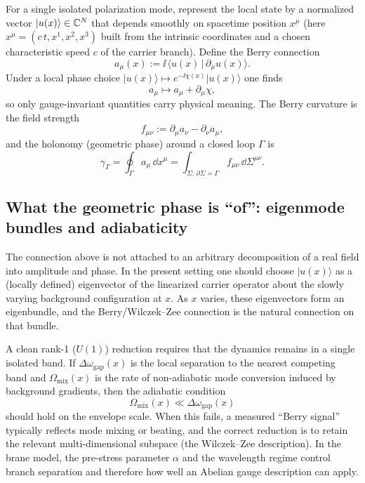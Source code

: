 For a single isolated polarization mode, represent the local state by a normalized vector
$\lvert u(x)\rangle\in\mathbb{C}^{N}$ that depends smoothly on spacetime position $x^\mu$
(here $x^\mu=(c\,t,x^1,x^2,x^3)$ built from the intrinsic coordinates and a chosen characteristic speed $c$ of the
carrier branch).
Define the Berry connection
\begin{equation}
  a_\mu(x) := \ii\,\langle u(x)\,|\,\partial_\mu u(x)\rangle.
  \label{eq:berry-connection}
\end{equation}
Under a local phase choice $\lvert u(x)\rangle\mapsto e^{-\ii\chi(x)}\lvert u(x)\rangle$ one finds
\begin{equation}
  a_\mu \mapsto a_\mu + \partial_\mu \chi,
  \label{eq:berry-gauge}
\end{equation}
so only gauge-invariant quantities carry physical meaning.
The Berry curvature is the field strength
\begin{equation}
  f_{\mu\nu} := \partial_\mu a_\nu - \partial_\nu a_\mu,
  \label{eq:berry-curvature}
\end{equation}
and the holonomy (geometric phase) around a closed loop $\Gamma$ is
\begin{equation}
  \gamma_\Gamma
  = \oint_\Gamma a_\mu\,\dd x^\mu
  = \int_{\Sigma:\,\partial\Sigma=\Gamma} f_{\mu\nu}\,\dd\Sigma^{\mu\nu}.
  \label{eq:berry-holonomy}
\end{equation}

\subsection{What the geometric phase is ``of'': eigenmode bundles and adiabaticity}
\label{subsec:berry-of}

The connection above is not attached to an arbitrary decomposition of a real field into amplitude and phase.
In the present setting one should choose $\lvert u(x)\rangle$ as a (locally defined) eigenvector of the
linearized carrier operator about the slowly varying background configuration at $x$.
As $x$ varies, these eigenvectors form an eigenbundle, and the Berry/Wilczek--Zee connection is the natural
connection on that bundle.

A clean rank-1 ($U(1)$) reduction requires that the dynamics remains in a single isolated band.
If $\Delta\omega_{\mathrm{gap}}(x)$ is the local separation to the nearest competing band and
$\Omega_{\mathrm{mix}}(x)$ is the rate of non-adiabatic mode conversion induced by background gradients,
then the adiabatic condition
\begin{equation}
  \Omega_{\mathrm{mix}}(x)\ll \Delta\omega_{\mathrm{gap}}(x)
  \label{eq:adiabatic-condition}
\end{equation}
should hold on the envelope scale.
When this fails, a measured ``Berry signal'' typically reflects mode mixing or beating, and the correct reduction
is to retain the relevant multi-dimensional subspace (the Wilczek--Zee description).
In the brane model, the pre-stress parameter $\alpha$ and the wavelength regime control branch separation and
therefore how well an Abelian gauge description can apply.

